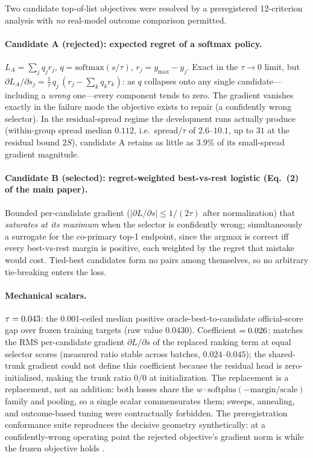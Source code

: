 \documentclass[10pt,twocolumn,letterpaper]{article}
\begin{document}
Two candidate top-of-list objectives were resolved by a preregistered 12-criterion analysis with \emph{no} real-model outcome comparison permitted.

\paragraph{Candidate A (rejected): expected regret of a softmax policy.}
$L_A=\sum_j q_j r_j$, $q=\mathrm{softmax}(s/\tau)$, $r_j = y_{\max}-y_j$.
Exact in the $\tau\to0$ limit, but
$\partial L_A/\partial s_j = \tfrac{1}{\tau}\,q_j\,(r_j - \textstyle\sum_k q_k r_k)$:
as $q$ collapses onto any single candidate---including a \emph{wrong} one---every component tends to zero.
The gradient vanishes exactly in the failure mode the objective exists to repair (a confidently wrong selector).
In the residual-spread regime the development runs actually produce (within-group spread median $0.112$, i.e.\ spread$/\tau$ of $2.6$--$10.1$, up to $31$ at the residual bound $2S$), candidate A retains as little as $3.9\%$ of its small-spread gradient magnitude.

\paragraph{Candidate B (selected): regret-weighted best-vs-rest logistic (Eq.~(2) of the main paper).}
Bounded per-candidate gradient ($|\partial L/\partial s|\le 1/(2\tau)$ after normalization) that \emph{saturates at its maximum} when the selector is confidently wrong; simultaneously a surrogate for the co-primary top-1 endpoint, since the argmax is correct iff every best-vs-rest margin is positive, each weighted by the regret that mistake would cost.
Tied-best candidates form no pairs among themselves, so no arbitrary tie-breaking enters the loss.

\paragraph{Mechanical scalars.}
$\tau=0.043$: the 0.001-ceiled median positive oracle-best-to-candidate official-score gap over frozen training targets (raw value $0.0430$).
Coefficient $=0.026$: matches the RMS per-candidate gradient $\partial L/\partial s$ of the replaced ranking term at equal selector scores (measured ratio stable across batches, $0.024$--$0.045$); the shared-trunk gradient could not define this coefficient because the residual head is zero-initialized, making the trunk ratio $0/0$ at initialization.
The replacement is a replacement, not an addition: both losses share the $w\cdot\mathrm{softplus}(-\text{margin}/\text{scale})$ family and pooling, so a single scalar commensurates them; sweeps, annealing, and outcome-based tuning were contractually forbidden.
The preregistration conformance suite reproduces the decisive geometry synthetically: at a confidently-wrong operating point the rejected objective's gradient norm is \SelGradVanish{} while the frozen objective holds \SelGradSat.
\end{document}
